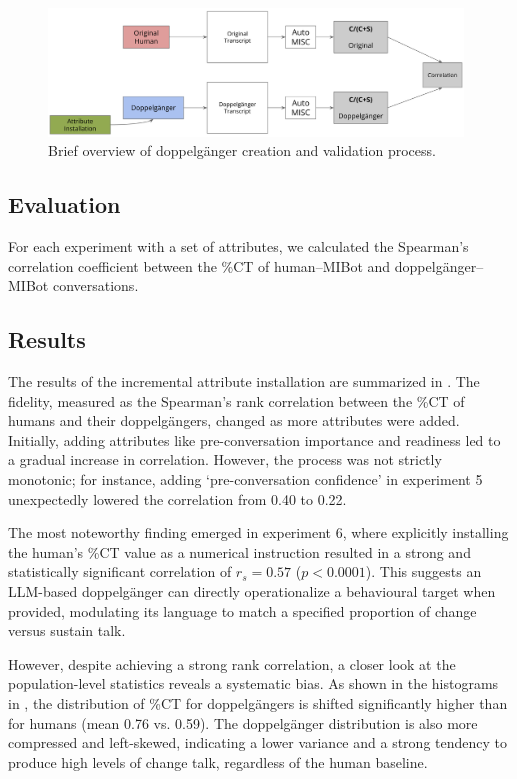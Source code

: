 \begin{figure}[htpb]
	\centering
	\includegraphics[width=0.98\textwidth]{fig/doppelganger_process.png}
	\caption[Brief overview of doppelgänger creation and validation process]{Brief overview of doppelgänger creation and validation process.}
	\label{fig:doppelgänger-creation-process}
\end{figure}

\subsection{Evaluation}
For each experiment with a set of attributes, we calculated the Spearman's correlation coefficient between the \%CT of human--MIBot and doppelgänger--MIBot conversations.



\subsection{Results}
The results of the incremental attribute installation are summarized in . The fidelity, measured as the Spearman's rank correlation between the \%CT of humans and their doppelgängers, changed as more attributes were added. Initially, adding attributes like pre-conversation importance and readiness led to a gradual increase in correlation. However, the process was not strictly monotonic; for instance, adding `pre-conversation confidence' in experiment 5 unexpectedly lowered the correlation from 0.40 to 0.22.

The most noteworthy finding emerged in experiment 6, where explicitly installing the human's \%CT value as a numerical instruction resulted in a strong and statistically significant correlation of $r_s = 0.57$ ($p < 0.0001$). This suggests an LLM-based doppelgänger can directly operationalize a behavioural target when provided, modulating its language to match a specified proportion of change versus sustain talk.

However, despite achieving a strong rank correlation, a closer look at the population-level statistics reveals a systematic bias. As shown in the histograms in , the distribution of \%CT for doppelgängers is shifted significantly higher than for humans (mean 0.76 vs. 0.59). The doppelgänger distribution is also more compressed and left-skewed, indicating a lower variance and a strong tendency to produce high levels of change talk, regardless of the human baseline.

